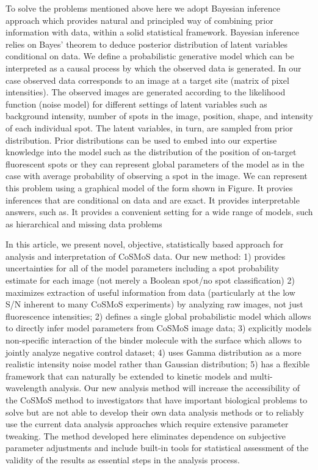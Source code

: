 To solve the problems mentioned above here we adopt Bayesian inference approach which provides natural and principled way of combining prior information with data, within a solid statistical framework. Bayesian inference relies on Bayes' theorem to deduce posterior distribution of latent variables conditional on data. We define a probabilistic generative model which can be interpreted as a causal process by which the observed data is generated. In our case observed data corresponds to an image at a target site (matrix of pixel intensities). The observed images are generated according to the likelihood function (noise model) for different settings of latent variables such as background intensity, number of spots in the image, position, shape, and intensity of each individual spot. The latent variables, in turn, are sampled from prior distribution. Prior distributions can be used to embed into our expertise knowledge into the model such as the distribution of the position of on-target fluorescent spots or they can represent global parameters of the model as in the case with average probability of observing a spot in the image. We can represent this problem using a graphical model of the form shown in Figure. It provies inferences that are conditional on data and are exact. It provides interpretable answers, such as. It provides a convenient setting for a wide range of models, such as hierarchical and missing data problems

In this article, we present novel, objective, statistically based approach for analysis and interpretation of CoSMoS data. Our new method: 1) provides uncertainties for all of the model parameters including a spot probability estimate for each image (not merely a Boolean spot/no spot classification) 2) maximizes extraction of useful information from data (particularly at the low S/N inherent to many CoSMoS experiments) by analyzing raw images, not just fluorescence intensities; 2) defines a single global probabilistic model which allows to directly infer model parameters from CoSMoS image data; 3) explicitly models non-specific interaction of the binder molecule with the surface which allows to jointly analyze negative control dataset; 4) uses Gamma distribution as a more realistic intensity noise model rather than Gaussian distribution; 5) has a flexible framework that can naturally be extended to kinetic models and multi-wavelength analysis. Our new analysis method will increase the accessibility of the CoSMoS method to investigators that have important biological problems to solve but are not able to develop their own data analysis methods or to reliably use the current data analysis approaches which require extensive parameter tweaking. The method developed here eliminates dependence on subjective parameter adjustments and include built-in tools for statistical assessment of the validity of the results as essential steps in the analysis process.